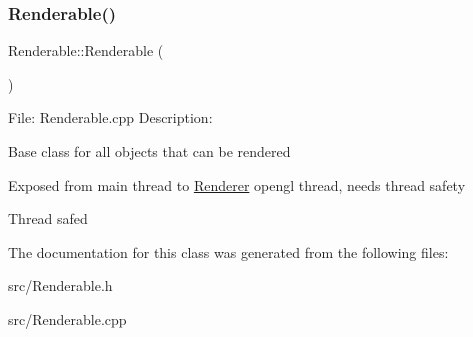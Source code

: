 \subsubsection{\texorpdfstring{Renderable()}{Renderable()}}
{\footnotesize\ttfamily Renderable\+::\+Renderable (\begin{DoxyParamCaption}{ }\end{DoxyParamCaption})}

File\+: Renderable.\+cpp Description\+:

Base class for all objects that can be rendered

Exposed from main thread to \mbox{\hyperlink{classdarksun_1_1_renderer}{Renderer}} opengl thread, needs thread safety

Thread safed 

The documentation for this class was generated from the following files\+:\begin{DoxyCompactItemize}
\item 
src/Renderable.\+h\item 
src/Renderable.\+cpp\end{DoxyCompactItemize}
